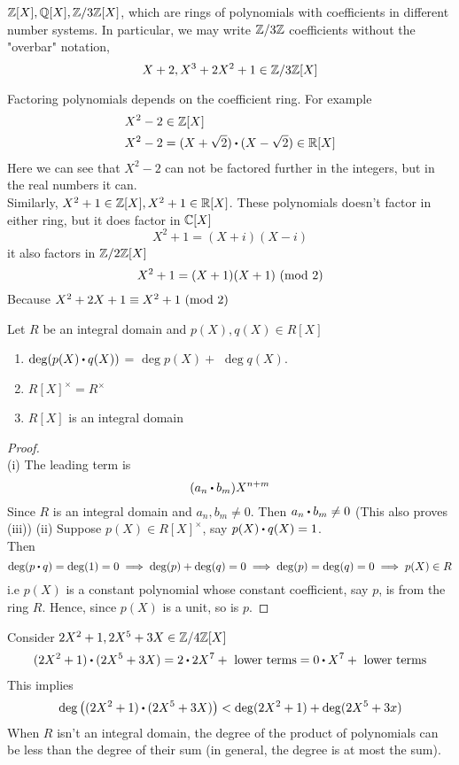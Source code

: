 \documentclass[../Main.tex]{subfiles}
\begin{document}
	\newpage
	\begin{example}
		$\mathbb{Z}[X],\mathbb{Q}[X],\mathbb{Z}/3\mathbb{Z}[X]$, which are rings of polynomials with coefficients in different number systems. In particular, we may write $\mathbb{Z}/3\mathbb{Z}$ coefficients without the "overbar" notation,
		\[X+2, X^3+2X^2+1 \in \mathbb{Z}/3\mathbb{Z}[X]\]
	\end{example}
	Factoring polynomials depends on the coefficient ring. For example
	\begin{align*}
		&X^2-2\in \Z[X] \\
		&X^2-2 = (X+\sqrt{2})\rdot (X-\sqrt{2}) \in \R[X]
	\end{align*}
	Here we can see that $X^2-2$ can not be factored further in the integers, but in the real numbers it can.\\
	Similarly, $X^2+1\in\mathbb{Z}[X], X^2+1\in \mathbb{R}[X]$. These polynomials doesn't factor in either ring, but it does factor in $\mathbb{C}[X]$
	\[X ^2+1=(X+i)(X-i)\]
	it also factors in $\mathbb{Z}/2\mathbb{Z}[X]$
	\[X^2+1=(X+1)(X+1) \ (\mathrm{mod}\ 2)\]
	Because $X^2+2X+1\equiv X^2+1 \ (\mathrm{mod}\ 2)$
	\begin{prop}[title = \texorpdfstring{$R[X]$}{R[X]} is an integral domain]
		Let $R$ be an integral domain and
		$p(X),q(X)\in R[X]$
		\begin{enumerate}
			\item  $\deg(p(X)\rdot q(X))$ = $\deg p(X)+$  $\deg q(X)$.
			\item $R[X]^\times = R^\times$
			\item $R[X]$ is an integral domain
		\end{enumerate}
	\end{prop}
	\begin{proof}~\\
	(i) The leading term is
			\[(a_n\rdot b_m)X^{n+m}\]
			Since $R$ is an integral domain and $a_n,b_m\ne 0$. Then $a_n\rdot b_m\ne 0$ (This also proves (iii))
	(ii) Suppose $p(X) \in R[X]^\times$, say $p(X)\rdot q(X)=1$.\\
			Then \[\deg(p\rdot q) = \deg(1) = 0\implies \deg(p)+\deg(q)=0\implies \deg(p)=\deg(q)=0\implies p(X)\in R\]
		i.e $p(X)$ is a constant polynomial whose constant coefficient, say $p$, is from the ring $R$. Hence, since $p(X)$ is a unit, so is $p$.
	\end{proof}
	\begin{example}
		Consider $2X^2 +1, 2X^5+3X \in \mathbb{Z}/4\mathbb{Z}[X]$
		\begin{align*}
		(2X^2+1)\rdot (2X^5+3X)=2\rdot 2X^7 + \text{ lower terms}
		= 0\rdot X^7 + \text{ lower terms}
		\end{align*}
	This implies
	\[\deg \left((2X^2+1)\rdot (2X^5+3X)\right)<\deg(2X^2+1)+\deg(2X^5+3x) \]
	When $R$ isn't an integral domain, the degree of the product of polynomials can be less than the degree of their sum (in general, the degree is at most the sum).
	\end{example}
\end{document}
